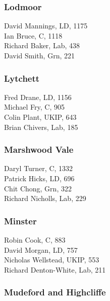 \documentclass[a4paper,openany,10pt]{book}
\begin{document}
\subsubsection*{Lodmoor}



David Mannings, LD, 1175\\
Ian Bruce, C, 1118\\
Richard Baker, Lab, 438\\
David Smith, Grn, 221\\


\subsubsection*{Lytchett}



Fred Drane, LD, 1156\\
Michael Fry, C, 905\\
Colin Plant, UKIP, 643\\
Brian Chivers, Lab, 185\\


\subsubsection*{Marshwood Vale}



Daryl Turner, C, 1332\\
Patrick Hicks, LD, 696\\
Chit Chong, Grn, 322\\
Richard Nicholls, Lab, 229\\


\subsubsection*{Minster}



Robin Cook, C, 883\\
David Morgan, LD, 757\\
Nicholas Wellstead, UKIP, 553\\
Richard Denton-White, Lab, 211\\


\subsubsection*{Mudeford and Highcliffe}
\end{document}
